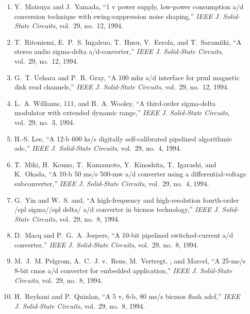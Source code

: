 \begin{enumerate}
\item
Y.~Matsuya and J.~Yamada, ``1 v power supply, low-power consumption a/d
  conversion technique with swing-suppression noise shaping,'' \emph{{IEEE} J.
  Solid-State Circuits}, vol.~29, no.~12, 1994.

\item
T.~Ritoniemi, E.~P.~S. Ingalsuo, T.~Husu, V.~Eerola, and T.~Saramiiki, ``A
  stereo audio sigma-delta a/d-converter,'' \emph{{IEEE} J. Solid-State
  Circuits}, vol.~29, no.~12, 1994.

\item
G.~T. Uehara and P.~R. Gray, ``A 100 mhz a/d interface for prml magnetic disk
  read channels,'' \emph{{IEEE} J. Solid-State Circuits}, vol.~29, no.~12,
  1994.

\item
L.~A. Williams, 111, and B.~A. Wooley, ``A third-order sigma-delta modulator
  with extended dynamic range,'' \emph{{IEEE} J. Solid-State Circuits},
  vol.~29, no.~3, 1994.

\item
H.-S. Lee, ``A 12-b 600 ks/s digitally self-calibrated pipelined algorithmic
  adc,'' \emph{{IEEE} J. Solid-State Circuits}, vol.~29, no.~4, 1994.

\item
T.~Miki, H.~Kouno, T.~Kumamoto, Y.~Kinoshita, T.~Igarashi, and K.~Okada, ``A
  10-b 50 ms/s 500-mw a/d converter using a differential-voltage
  subconverter,'' \emph{{IEEE} J. Solid-State Circuits}, vol.~29, no.~4, 1994.

\item
G.~Yin and W.~S. and, ``A high-frequency and high-resolution fourth-order /spl
  sigma//spl delta/ a/d converter in bicmos technology,'' \emph{{IEEE} J.
  Solid-State Circuits}, vol.~29, no.~8, 1994.

\item
D.~Macq and P.~G.~A. Jespers, ``A 10-bit pipelined switched-current a/d
  converter,'' \emph{{IEEE} J. Solid-State Circuits}, vol.~29, no.~8, 1994.

\item
M.~J.~M. Pelgrom, A.~C.~J. v.~Rens, M.~Vertregt, , and Marcel, ``A 25-ms/s
  8-bit cmos a/d converter for embedded application,'' \emph{{IEEE} J.
  Solid-State Circuits}, vol.~29, no.~8, 1994.

\item
H.~Reyhani and P.~Quinlan, ``A 5 v, 6-b, 80 ms/s bicmos flash adcf,''
  \emph{{IEEE} J. Solid-State Circuits}, vol.~29, no.~8, 1994.


\end{enumerate}
